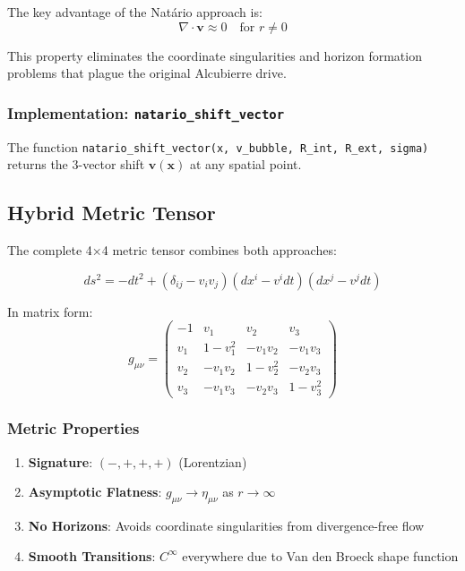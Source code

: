 The key advantage of the Natário approach is:
\begin{equation}
\nabla \cdot \mathbf{v} \approx 0 \quad \text{for } r \neq 0
\end{equation}

This property eliminates the coordinate singularities and horizon formation problems that plague the original Alcubierre drive.

\subsubsection{Implementation: \texttt{natario\_shift\_vector}}

The function \texttt{natario\_shift\_vector(x, v\_bubble, R\_int, R\_ext, sigma)} returns the 3-vector shift $\mathbf{v}(\mathbf{x})$ at any spatial point.

\subsection{Hybrid Metric Tensor}

The complete 4×4 metric tensor combines both approaches:

\begin{equation}
ds^2 = -dt^2 + (\delta_{ij} - v_i v_j)(dx^i - v^i dt)(dx^j - v^j dt)
\end{equation}

In matrix form:
\begin{equation}
g_{\mu\nu} = \begin{pmatrix}
-1 & v_1 & v_2 & v_3 \\
v_1 & 1 - v_1^2 & -v_1 v_2 & -v_1 v_3 \\
v_2 & -v_1 v_2 & 1 - v_2^2 & -v_2 v_3 \\
v_3 & -v_1 v_3 & -v_2 v_3 & 1 - v_3^2
\end{pmatrix}
\end{equation}

\subsubsection{Metric Properties}

\begin{enumerate}
\item \textbf{Signature}: $(-,+,+,+)$ (Lorentzian)
\item \textbf{Asymptotic Flatness}: $g_{\mu\nu} \to \eta_{\mu\nu}$ as $r \to \infty$
\item \textbf{No Horizons}: Avoids coordinate singularities from divergence-free flow
\item \textbf{Smooth Transitions}: $C^{\infty}$ everywhere due to Van den Broeck shape function
\end{enumerate}

